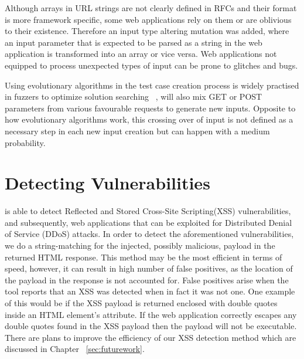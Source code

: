Although arrays in URL strings are not clearly defined in RFCs and their format is more framework specific, some web applications rely on them or are oblivious to their existence. Therefore an input type altering mutation was added, where an input parameter that is
expected to be parsed as a string in the web application is transformed into an array or vice versa. Web applications not equipped to process unexpected types of input can be prone to glitches and bugs.

Using evolutionary algorithms in the test case creation process is widely practised in fuzzers
to optimize solution searching ~\cite{seal2016Genetic}, \pname{} will also mix GET or POST parameters from various favourable requests to generate new inputs. Opposite to how evolutionary algorithms work, this crossing over of input is not defined as a necessary step in each new input creation but can happen with a medium probability.

\section{Detecting Vulnerabilities}
\pname{} is able to detect Reflected and Stored Cross-Site Scripting(XSS) vulnerabilities, and subsequently, web applications that can be exploited for Distributed Denial of Service (DDoS) attacks. In order to detect the aforementioned vulnerabilities, we do a string-matching for the injected, possibly malicious, payload in the returned HTML response. This method may be the most efficient in terms of speed, however, it can result in high number of false positives, as the location of the payload in the response is not accounted for. False positives arise when the tool reports that an XSS was detected when in fact it was not one. One example of this would be if the XSS payload is returned enclosed with double quotes inside an HTML element's attribute. If the web application correctly escapes any double quotes found in the XSS payload then the payload will not be executable. There are plans to improve the efficiency of our XSS detection method which are discussed in Chapter ~\ref{sec:futurework}.
